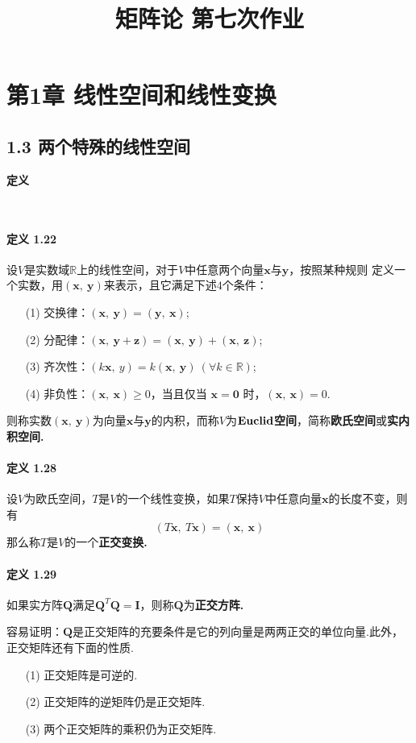 \documentclass[12pt, a4paper, oneside, fontset=none]{ctexart}
\author{}
\date{}
\title{\vspace{-3em}\textbf{矩阵论 \quad 第七次作业}\vspace{-3em}}
\begin{document}
\maketitle

\section*{第1章 \quad 线性空间和线性变换}

\subsection*{1.3 \quad 两个特殊的线性空间}

\centerline{\large{\textbf{定义}}} \ \par

\paragraph*{定义 1.22} 设$V$是实数域$\mathbb{R}$上的线性空间，对于$V$中任意两个向量$\bm{x}$与$\bm{y}$，按照某种规则
定义一个实数，用$(\bm{x},\ \bm{y})$来表示，且它满足下述$4$个条件：
\begin{enumerate}
    \item[(1)] 交换律：$(\bm{x},\ \bm{y}) = (\bm{y},\ \bm{x})$;
    \item[(2)] 分配律：$(\bm{x,\ \bm{y} + \bm{z}}) = (\bm{x},\ \bm{y}) + (\bm{x},\ \bm{z})$;
    \item[(3)] 齐次性：$(k\bm{x},\ y) = k(\bm{x},\ \bm{y})\ (\forall k \in \mathbb{R})$;
    \item[(4)] 非负性：$(\bm{x},\ \bm{x}) \geqslant 0$，当且仅当 $\bm{x} = \bm{0}$ 时，$(\bm{x},\ \bm{x}) = 0$.
\end{enumerate}
则称实数$(\bm{x},\ \bm{y})$为向量$\bm{x}$与$\bm{y}$的内积，而称$V$为\textbf{$\bm{{\rm Euclid}}$空间}，简称\textbf{欧氏空间}或\textbf{实内积空间.}

\paragraph*{定义 1.28} 设$V$为欧氏空间，$T$是$V$的一个线性变换，如果$T$保持$V$中任意向量$\bm{x}$的长度不变，则有
\[
    (T\bm{x},\ T\bm{x}) = (\bm{x},\ \bm{x})
\]
那么称$T$是$V$的一个\textbf{正交变换.}

\paragraph*{定义 1.29} 如果实方阵$\bm{Q}$满足$\bm{Q}^T\bm{Q} = \bm{I}$，则称$\bm{Q}$为\textbf{正交方阵.} \par
容易证明：$\bm{Q}$是正交矩阵的充要条件是它的列向量是两两正交的单位向量.此外，正交矩阵还有下面的性质.
\begin{enumerate}
    \item[(1)] 正交矩阵是可逆的.
    \item[(2)] 正交矩阵的逆矩阵仍是正交矩阵.
    \item[(3)] 两个正交矩阵的乘积仍为正交矩阵.
\end{enumerate}
\end{document}
